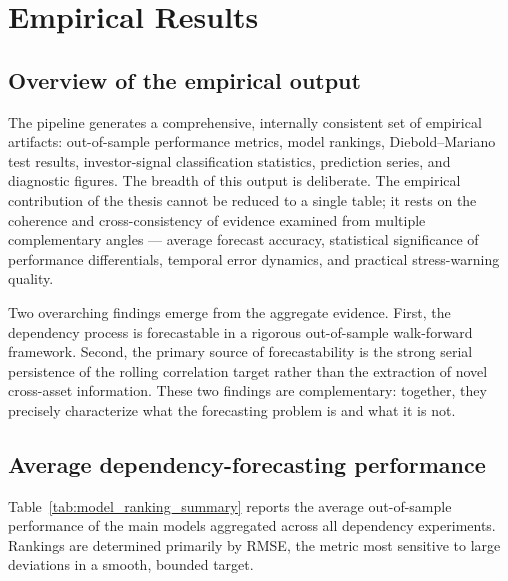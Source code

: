 \section{Empirical Results}

\subsection{Overview of the empirical output}
\label{sec:results_overview}

The pipeline generates a comprehensive, internally consistent set of empirical artifacts: out-of-sample performance metrics, model rankings, Diebold--Mariano test results, investor-signal classification statistics, prediction series, and diagnostic figures. The breadth of this output is deliberate. The empirical contribution of the thesis cannot be reduced to a single table; it rests on the coherence and cross-consistency of evidence examined from multiple complementary angles --- average forecast accuracy, statistical significance of performance differentials, temporal error dynamics, and practical stress-warning quality.

Two overarching findings emerge from the aggregate evidence. First, the dependency process is forecastable in a rigorous out-of-sample walk-forward framework. Second, the primary source of forecastability is the strong serial persistence of the rolling correlation target rather than the extraction of novel cross-asset information. These two findings are complementary: together, they precisely characterize what the forecasting problem is and what it is not.

\subsection{Average dependency-forecasting performance}

Table~\ref{tab:model_ranking_summary} reports the average out-of-sample performance of the main models aggregated across all dependency experiments. Rankings are determined primarily by RMSE, the metric most sensitive to large deviations in a smooth, bounded target.


